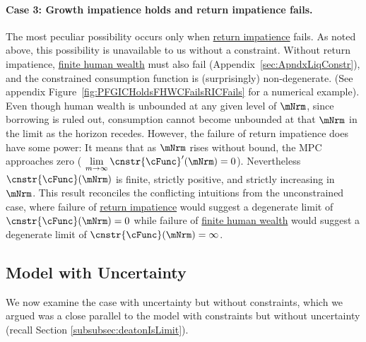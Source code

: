 \documentclass[BufferStockTheory]{subfiles}
\begin{document}
\hypertarget{RICandFHWCFail}{}
\paragraph{Case 3: Growth impatience holds and return impatience fails.} The most peculiar possibility occurs only when \hyperlink{RIC}{return impatience} fails.
As noted above, this possibility is unavailable to us without a constraint.
Without return impatience, \hyperlink{FHWC}{finite human wealth} must also fail (Appendix~\ref{sec:ApndxLiqConstr}), and the constrained consumption function is (surprisingly) non-degenerate.
(See appendix Figure~\ref{fig:PFGICHoldsFHWCFailsRICFails} for a numerical example).
Even though human wealth is unbounded at any given level of $\mNrm$, since borrowing is ruled out, consumption cannot become unbounded at that $\mNrm$ in the limit as the horizon recedes.
However, the failure of return impatience does have some power: It means that as $\mNrm$ rises without bound, the MPC approaches zero ( $\lim\limits_{m \rightarrow \infty} \cnstr{\cFunc}^{\prime}(\mNrm) = 0$).
Nevertheless $\cnstr{\cFunc}(\mNrm)$ is finite, strictly positive, and strictly increasing in $\mNrm$.
This result reconciles the conflicting intuitions from the unconstrained case, where failure of \hyperlink{RIC}{return impatience} would suggest a degenerate limit of $\cnstr{\cFunc}(\mNrm)=0$ while failure of \hyperlink{FHWC}{finite human wealth} would suggest a degenerate limit of $\cnstr{\cFunc}(\mNrm)=\infty$.





\hypertarget{model-with-uncertainty}{}
\subsection{Model with Uncertainty}\label{subsec:TheModelUncertainty}

We now examine the case with uncertainty but without constraints, which we argued was a close parallel to the model with constraints but without uncertainty (recall Section \ref{subsubsec:deatonIsLimit}).
\hypertarget{Calibration}{}


\hypertarget{Symbols}{}


\end{document}
